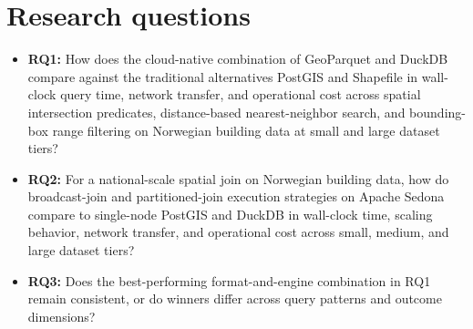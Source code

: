 \section{Research questions}
\label{related-work:research-questions}
\begin{itemize}
    \item \textbf{RQ1:} How does the cloud-native combination of GeoParquet and DuckDB compare against the traditional alternatives PostGIS and Shapefile in wall-clock query time, network transfer, and operational cost across spatial intersection predicates, distance-based nearest-neighbor search, and bounding-box range filtering on Norwegian building data at small and large dataset tiers?
    \item \textbf{RQ2:} For a national-scale spatial join on Norwegian building data, how do broadcast-join and partitioned-join execution strategies on Apache Sedona compare to single-node PostGIS and DuckDB in wall-clock time, scaling behavior, network transfer, and operational cost across small, medium, and large dataset tiers?
    \item \textbf{RQ3:} Does the best-performing format-and-engine combination in RQ1 remain consistent, or do winners differ across query patterns and outcome dimensions?
\end{itemize}
